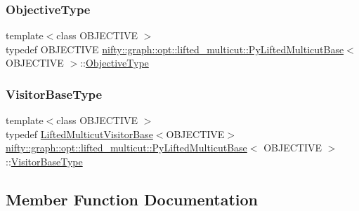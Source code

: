 \subsubsection{\texorpdfstring{Objective\+Type}{ObjectiveType}}
{\footnotesize\ttfamily template$<$class O\+B\+J\+E\+C\+T\+I\+VE $>$ \\
typedef O\+B\+J\+E\+C\+T\+I\+VE \hyperlink{classnifty_1_1graph_1_1opt_1_1lifted__multicut_1_1PyLiftedMulticutBase}{nifty\+::graph\+::opt\+::lifted\+\_\+multicut\+::\+Py\+Lifted\+Multicut\+Base}$<$ O\+B\+J\+E\+C\+T\+I\+VE $>$\+::\hyperlink{classnifty_1_1graph_1_1opt_1_1lifted__multicut_1_1PyLiftedMulticutBase_a2e2f37a21bb3b5e986e130287bcdeede}{Objective\+Type}}

\mbox{\label{classnifty_1_1graph_1_1opt_1_1lifted__multicut_1_1PyLiftedMulticutBase_ac5e5eff52536f20200ad9004bea80998}} 
\subsubsection{\texorpdfstring{Visitor\+Base\+Type}{VisitorBaseType}}
{\footnotesize\ttfamily template$<$class O\+B\+J\+E\+C\+T\+I\+VE $>$ \\
typedef \hyperlink{namespacenifty_1_1graph_1_1opt_1_1lifted__multicut_a3350124f8869505fecf39d697b9b2718}{Lifted\+Multicut\+Visitor\+Base}$<$O\+B\+J\+E\+C\+T\+I\+VE$>$ \hyperlink{classnifty_1_1graph_1_1opt_1_1lifted__multicut_1_1PyLiftedMulticutBase}{nifty\+::graph\+::opt\+::lifted\+\_\+multicut\+::\+Py\+Lifted\+Multicut\+Base}$<$ O\+B\+J\+E\+C\+T\+I\+VE $>$\+::\hyperlink{classnifty_1_1graph_1_1opt_1_1lifted__multicut_1_1PyLiftedMulticutBase_ac5e5eff52536f20200ad9004bea80998}{Visitor\+Base\+Type}}



\subsection{Member Function Documentation}
\mbox{\label{classnifty_1_1graph_1_1opt_1_1lifted__multicut_1_1PyLiftedMulticutBase_a6d178e143ed30594ac6253e10da4e117}} 
